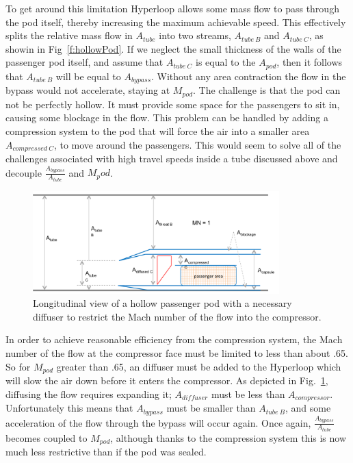 \documentclass[heading.tex]{subfiles}
\begin{document}
To get around this limitation Hyperloop allows some mass flow to pass through the pod itself, thereby increasing
the maximum achievable speed. This effectively splits the relative mass flow in $A_{tube}$ into two streams, 
$A_{tube\ B}$ and  $A_{tube\ C}$, as showin in Fig~\ref{f:hollowPod}. If we neglect the small thickness of the walls of
the passenger pod itself, and assume that $A_{tube\ C}$ is equal to the $A_{pod}$, then it follows that $A_{tube\ B}$ 
will be equal to $A_{bypass}$. Without any area contraction the flow in the bypass would not accelerate, staying 
at $M_{pod}$. The challenge is that the pod can not be perfectly hollow. It must provide some space for the passengers
to sit in, causing some blockage in the flow. This problem can be handled by adding a compression system to the 
pod that will force the air into a smaller area $A_{compressed\ C}$, to move around the passengers. This would 
seem to solve all of the challenges associated with high travel speeds inside a tube discussed above and decouple 
$\frac{A_{bypass}}{A_{tube}}$ and ${M_pod}$.


\begin{figure}[hbtp]
\centering
\includegraphics[width=0.85\textwidth]{images/inletCapsule.png}
\caption{Longitudinal view of a hollow passenger pod with a necessary diffuser to restrict the Mach number of the flow into the compressor.}
\label{f:OpenPod}
\end{figure}

In order to achieve reasonable efficiency from the compression system, the Mach number of the flow at the compressor face
must be limited to less than about .65. So for $M_{pod}$ greater than .65, an diffuser must be added to the Hyperloop 
which will slow the air down before it enters the compressor. As depicted in Fig.~\ref{f:OpenPod}, diffusing the flow 
requires expanding it; $A_{diffuser}$ must be less than $A_{compressor}$. Unfortunately this means that
$A_{bypass}$ must be smaller than $A_{tube\ B}$, and some acceleration of the flow through the 
bypass will occur again. Once again, $\frac{A_{bypass}}{A_{tube}}$ becomes coupled to $M_{pod}$, although thanks to the compression 
system this is now much less restrictive than if the pod was sealed. 
\end{document}
